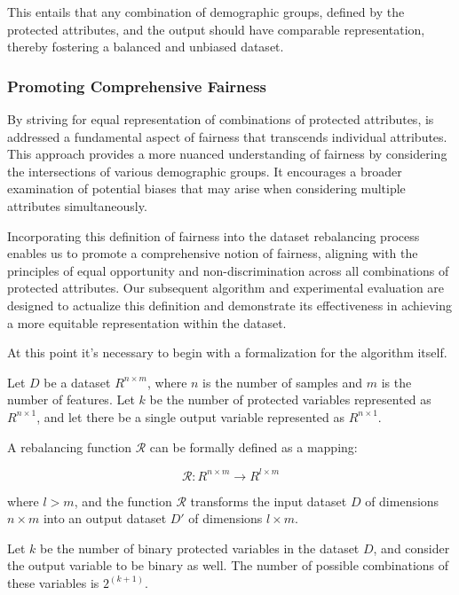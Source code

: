 \documentclass[12pt,a4paper,openright,twoside]{book}
\begin{document}
This entails that any combination of demographic groups, defined by the protected attributes, and the output should have comparable representation, thereby fostering a balanced and unbiased dataset.

\subsubsection{Promoting Comprehensive Fairness}

By striving for equal representation of combinations of protected attributes, is addressed a fundamental aspect of fairness that transcends individual attributes. This approach provides a more nuanced understanding of fairness by considering the intersections of various demographic groups. It encourages a broader examination of potential biases that may arise when considering multiple attributes simultaneously.

Incorporating this definition of fairness into the dataset rebalancing process enables us to promote a comprehensive notion of fairness, aligning with the principles of equal opportunity and non-discrimination across all combinations of protected attributes. Our subsequent algorithm and experimental evaluation are designed to actualize this definition and demonstrate its effectiveness in achieving a more equitable representation within the dataset.

At this point it's necessary to begin with a formalization for the algorithm itself.


Let \( D \) be a dataset \( R^{n \times m} \), where \( n \) is the number of samples and \( m \) is the number of features. Let \( k \) be the number of protected variables represented as \( R^{n \times 1} \), and let there be a single output variable represented as \( R^{n \times 1} \).

A rebalancing function \( \mathcal{R} \) can be formally defined as a mapping:

\[
\mathcal{R}: R^{n \times m} \rightarrow R^{l \times m}
\]

where \( l > m \), and the function \( \mathcal{R} \) transforms the input dataset \( D \) of dimensions \( n \times m \) into an output dataset \( D' \) of dimensions \( l \times m \).



Let \( k \) be the number of binary protected variables in the dataset \( D \), and consider the output variable to be binary as well. The number of possible combinations of these variables is \( 2^{(k+1)} \).
\end{document}
